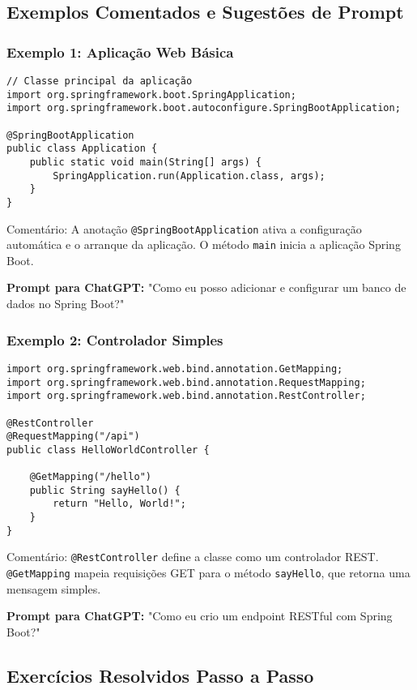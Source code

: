 \documentclass[a4paper,12pt]{book}
\begin{document}
\subsection{Exemplos Comentados e Sugestões de Prompt}

\subsubsection{Exemplo 1: Aplicação Web Básica}
\begin{verbatim}
// Classe principal da aplicação
import org.springframework.boot.SpringApplication;
import org.springframework.boot.autoconfigure.SpringBootApplication;

@SpringBootApplication
public class Application {
    public static void main(String[] args) {
        SpringApplication.run(Application.class, args);
    }
}
\end{verbatim}
Comentário: A anotação \texttt{@SpringBootApplication} ativa a configuração automática e o arranque da aplicação. O método \texttt{main} inicia a aplicação Spring Boot.

\textbf{Prompt para ChatGPT:} "Como eu posso adicionar e configurar um banco de dados no Spring Boot?"

\subsubsection{Exemplo 2: Controlador Simples}
\begin{verbatim}
import org.springframework.web.bind.annotation.GetMapping;
import org.springframework.web.bind.annotation.RequestMapping;
import org.springframework.web.bind.annotation.RestController;

@RestController
@RequestMapping("/api")
public class HelloWorldController {

    @GetMapping("/hello")
    public String sayHello() {
        return "Hello, World!";
    }
}
\end{verbatim}
Comentário: \texttt{@RestController} define a classe como um controlador REST. \texttt{@GetMapping} mapeia requisições GET para o método \texttt{sayHello}, que retorna uma mensagem simples.

\textbf{Prompt para ChatGPT:} "Como eu crio um endpoint RESTful com Spring Boot?"

\subsection{Exercícios Resolvidos Passo a Passo}
\end{document}

